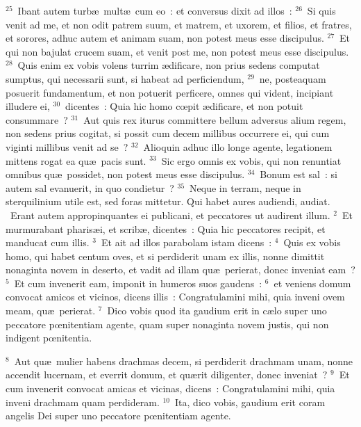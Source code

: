 ${}^{25}$~Ibant autem turb\ae\ mult\ae\ cum eo~: et conversus dixit ad illos~:
${}^{26}$~Si quis venit ad me, et non odit patrem suum, et matrem, et uxorem, et filios, et fratres, et sorores, adhuc autem et animam suam, non potest meus esse discipulus.
${}^{27}$~Et qui non bajulat crucem suam, et venit post me, non potest meus esse discipulus.
${}^{28}$~Quis enim ex vobis volens turrim \ae dificare, non prius sedens computat sumptus, qui necessarii sunt, si habeat ad perficiendum,
${}^{29}$~ne, posteaquam posuerit fundamentum, et non potuerit perficere, omnes qui vident, incipiant illudere ei,
${}^{30}$~dicentes~: Quia hic homo cœpit \ae dificare, et non potuit consummare~?
${}^{31}$~Aut quis rex iturus committere bellum adversus alium regem, non sedens prius cogitat, si possit cum decem millibus occurrere ei, qui cum viginti millibus venit ad se~?
${}^{32}$~Alioquin adhuc illo longe agente, legationem mittens rogat ea qu\ae\ pacis sunt.
${}^{33}$~Sic ergo omnis ex vobis, qui non renuntiat omnibus qu\ae\ possidet, non potest meus esse discipulus.
${}^{34}$~Bonum est sal~: si autem sal evanuerit, in quo condietur~?
${}^{35}$~Neque in terram, neque in sterquilinium utile est, sed foras mittetur. Qui habet aures audiendi, audiat.
~Erant autem appropinquantes ei publicani, et peccatores ut audirent illum.
${}^{2}$~Et murmurabant pharis\ae i, et scrib\ae , dicentes~: Quia hic peccatores recipit, et manducat cum illis.
${}^{3}$~Et ait ad illos parabolam istam dicens~:
${}^{4}$~Quis ex vobis homo, qui habet centum oves, et si perdiderit unam ex illis, nonne dimittit nonaginta novem in deserto, et vadit ad illam qu\ae\ perierat, donec inveniat eam~?
${}^{5}$~Et cum invenerit eam, imponit in humeros suos gaudens~:
${}^{6}$~et veniens domum convocat amicos et vicinos, dicens illis~: Congratulamini mihi, quia inveni ovem meam, qu\ae\ perierat.
${}^{7}$~Dico vobis quod ita gaudium erit in c\ae lo super uno peccatore pœnitentiam agente, quam super nonaginta novem justis, qui non indigent pœnitentia.


${}^{8}$~Aut qu\ae\ mulier habens drachmas decem, si perdiderit drachmam unam, nonne accendit lucernam, et everrit domum, et qu\ae rit diligenter, donec inveniat~?
${}^{9}$~Et cum invenerit convocat amicas et vicinas, dicens~: Congratulamini mihi, quia inveni drachmam quam perdideram.
${}^{10}$~Ita, dico vobis, gaudium erit coram angelis Dei super uno peccatore pœnitentiam agente.


